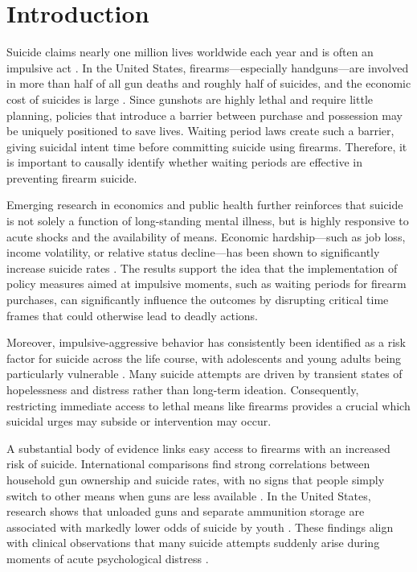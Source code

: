 \section{Introduction}

Suicide claims nearly one million lives worldwide each year and is often an impulsive act \autocite{lewieckiSuicideGunsPublic2013}. In the United States, firearms---especially handguns---are involved in more than half of all gun deaths and roughly half of suicides, and the economic cost of suicides is large \autocite{statisticsNationalVitalStatistics2007,greenbergEconomicBurdenAdults2015,greenbergEconomicBurdenAdults2021}. Since gunshots are highly lethal and require little planning, policies that introduce a barrier between purchase and possession may be uniquely positioned to save lives. Waiting period laws create such a barrier, giving suicidal intent time before committing suicide using firearms. Therefore, it is important to causally identify whether waiting periods are effective in preventing firearm suicide.

Emerging research in economics and public health further reinforces that suicide is not solely a function of long-standing mental illness, but is highly responsive to acute shocks and the availability of means. Economic hardship—such as job loss, income volatility, or relative status decline—has been shown to significantly increase suicide rates \autocite{breuer2014unemployment, christian2019income, daly2013relative}. The results support the idea that the implementation of policy measures aimed at impulsive moments, such as waiting periods for firearm purchases, can significantly influence the outcomes by disrupting critical time frames that could otherwise lead to deadly actions.

Moreover, impulsive-aggressive behavior has consistently been identified as a risk factor for suicide across the life course, with adolescents and young adults being particularly vulnerable \autocite{anestis2014impulsivity, mcgirr2008impulsive}. Many suicide attempts are driven by transient states of hopelessness and distress rather than long-term ideation. Consequently, restricting immediate access to lethal means like firearms provides a crucial which suicidal urges may subside or intervention may occur.


A substantial body of evidence links easy access to firearms with an increased risk of suicide. International comparisons find strong correlations between household gun ownership and suicide rates, with no signs that people simply switch to other means when guns are less available \autocite{killiasInternationalCorrelationsGun1993}. In the United States, research shows that unloaded guns and separate ammunition storage are associated with markedly lower odds of suicide by youth \autocite{grossmanGunStoragePractices2005}. These findings align with clinical observations that many suicide attempts suddenly arise during moments of acute psychological distress \autocite{lewieckiSuicideGunsPublic2013}.

